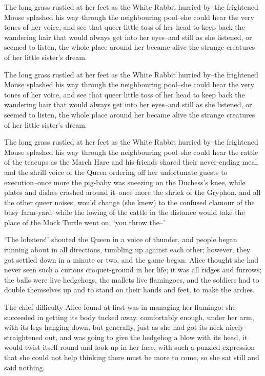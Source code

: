 \documentclass[statementpaper,twoside,openany]{memoir}
\begin{document}
The long grass rustled at her feet as the White Rabbit hurried by--the frightened Mouse splashed his way through the neighbouring pool--she could hear the very tones of her voice, and see that queer little toss of her head to keep back the wandering hair that would always get into her eyes--and still as she listened, or seemed to listen, the whole place around her became alive the strange creatures of her little sister's dream.

The long grass rustled at her feet as the White Rabbit hurried by--the frightened Mouse splashed his way through the neighbouring pool--she could hear the very tones of her voice, and see that queer little toss of her head to keep back the wandering hair that would always get into her eyes--and still as she listened, or seemed to listen, the whole place around her became alive the strange creatures of her little sister's dream.

The long grass rustled at her feet as the White Rabbit hurried by--the frightened Mouse splashed his way through the neighbouring pool--she could hear the rattle of the teacups as the March Hare and his friends shared their never-ending meal, and the shrill voice of the Queen ordering off her unfortunate guests to execution--once more the pig-baby was sneezing on the Duchess's knee, while plates and dishes crashed around it--once more the shriek of the Gryphon, and all the other queer noises, would change (she knew) to the confused clamour of the busy farm-yard--while the lowing of the cattle in the distance would take the place of the Mock Turtle went on, `you throw the--'

`The lobsters!' shouted the Queen in a voice of thunder, and people began running about in all directions, tumbling up against each other; however, they got settled down in a minute or two, and the game began. Alice thought she had never seen such a curious croquet-ground in her life; it was all ridges and furrows; the balls were live hedgehogs, the mallets live flamingoes, and the soldiers had to double themselves up and to stand on their hands and feet, to make the arches.

The chief difficulty Alice found at first was in managing her flamingo: she succeeded in getting its body tucked away, comfortably enough, under her arm, with its legs hanging down, but generally, just as she had got its neck nicely straightened out, and was going to give the hedgehog a blow with its head, it would twist itself round and look up in her face, with such a puzzled expression that she could not help thinking there must be more to come, so she sat still and said nothing.
\end{document}
